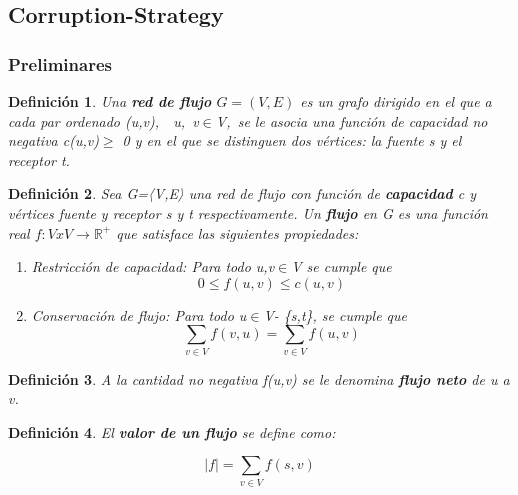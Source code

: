 \documentclass[10pt]{article} %
\newtheorem{mydef}{Definici\'on}%
\begin{document}
	\subsection{Corruption-Strategy}
	
	\subsubsection{Preliminares}
	\begin{mydef}
		Una \textbf{red de flujo} $G=(V,E)$ es un grafo dirigido en el que a cada par ordenado (u,v),  u, v$\in$V, se le asocia una función de capacidad no negativa c(u,v)$\geq$ 0 y en el que se distinguen dos vértices: la fuente s y el receptor t.
	\end{mydef}

	\begin{mydef}\label{red_flujo}
		Sea G=〈V,E〉 una red de flujo con función de \textbf{capacidad} c y vértices fuente y receptor s y t respectivamente. Un \textbf{flujo} en G es una función real $f:V x V\rightarrow \mathbb{R}^+$ que satisface las siguientes propiedades:
		
		\begin{enumerate}
			\item Restricci\'on de capacidad: Para todo u,v$\in$V se cumple que
			\begin{equation}
				0 \leq f(u,v) \leq c(u,v)
			\end{equation}
		
			\item Conservaci\'on de flujo: Para todo u$\in$V- \{s,t\}, se cumple que
			\begin{equation}
				\sum_{v \in V} f(v,u) = \sum_{v \in V} f(u,v)
			\end{equation}
			
		\end{enumerate}
		
	\end{mydef}

	\begin{mydef}\label{flujo_neto}
		A la cantidad  no negativa f(u,v) se le denomina \textbf{flujo neto} de u a v.
	\end{mydef}

	\begin{mydef}\label{valor_flujo}
		El \textbf{valor de un flujo} se define como:
		
		\begin{equation}
			|f|=\sum_{v \in V} f(s,v)
		\end{equation}
	\end{mydef}
\end{document}
